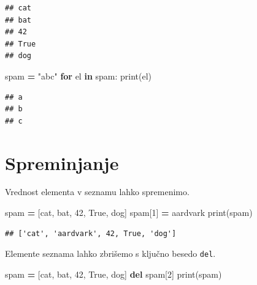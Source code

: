 \documentclass[
]{book}
\newenvironment{Shaded}{\begin{snugshade}}{\end{snugshade}}
\newcommand{\BuiltInTok}[1]{#1}
\newcommand{\ControlFlowTok}[1]{\textcolor[rgb]{0.13,0.29,0.53}{\textbf{#1}}}
\newcommand{\DecValTok}[1]{\textcolor[rgb]{0.00,0.00,0.81}{#1}}
\newcommand{\KeywordTok}[1]{\textcolor[rgb]{0.13,0.29,0.53}{\textbf{#1}}}
\newcommand{\NormalTok}[1]{#1}
\newcommand{\OperatorTok}[1]{\textcolor[rgb]{0.81,0.36,0.00}{\textbf{#1}}}
\newcommand{\StringTok}[1]{\textcolor[rgb]{0.31,0.60,0.02}{#1}}
\newcommand{\VariableTok}[1]{\textcolor[rgb]{0.00,0.00,0.00}{#1}}
\begin{document}
\begin{verbatim}
## cat
## bat
## 42
## True
## dog
\end{verbatim}

\begin{Shaded}
\begin{Highlighting}[]
\NormalTok{spam }\OperatorTok{=} \StringTok{"abc"}
\ControlFlowTok{for}\NormalTok{ el }\KeywordTok{in}\NormalTok{ spam:}
    \BuiltInTok{print}\NormalTok{(el)}
\end{Highlighting}
\end{Shaded}

\begin{verbatim}
## a
## b
## c
\end{verbatim}

\hypertarget{spreminjanje}{%
\section{Spreminjanje}\label{spreminjanje}}

Vrednost elementa v seznamu lahko spremenimo.

\begin{Shaded}
\begin{Highlighting}[]
\NormalTok{spam }\OperatorTok{=}\NormalTok{ [}\StringTok{\textquotesingle{}cat\textquotesingle{}}\NormalTok{, }\StringTok{\textquotesingle{}bat\textquotesingle{}}\NormalTok{, }\DecValTok{42}\NormalTok{, }\VariableTok{True}\NormalTok{, }\StringTok{\textquotesingle{}dog\textquotesingle{}}\NormalTok{]}
\NormalTok{spam[}\DecValTok{1}\NormalTok{] }\OperatorTok{=} \StringTok{\textquotesingle{}aardvark\textquotesingle{}}
\BuiltInTok{print}\NormalTok{(spam)}
\end{Highlighting}
\end{Shaded}

\begin{verbatim}
## ['cat', 'aardvark', 42, True, 'dog']
\end{verbatim}

Elemente seznama lahko zbrišemo s ključno besedo \texttt{del}.

\begin{Shaded}
\begin{Highlighting}[]
\NormalTok{spam }\OperatorTok{=}\NormalTok{ [}\StringTok{\textquotesingle{}cat\textquotesingle{}}\NormalTok{, }\StringTok{\textquotesingle{}bat\textquotesingle{}}\NormalTok{, }\DecValTok{42}\NormalTok{, }\VariableTok{True}\NormalTok{, }\StringTok{\textquotesingle{}dog\textquotesingle{}}\NormalTok{]}
\KeywordTok{del}\NormalTok{ spam[}\DecValTok{2}\NormalTok{]}
\BuiltInTok{print}\NormalTok{(spam)}
\end{Highlighting}
\end{Shaded}
\end{document}
